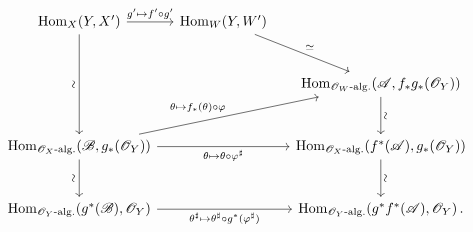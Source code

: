 \[
\begin{tikzcd}[column sep=small,row sep=large]
  \operatorname{Hom}_X(Y,X')
    \arrow[r,"g'\mapsto f'\circ g'"]
    \arrow[dd,"\rotatebox{90}{$\sim$}"']
  &
  \operatorname{Hom}_W(Y,W')
    \arrow[dr,"\simeq"]
  &
  {}
  \\
  {}
  &
  {}
  &
  \operatorname{Hom}_{\mathscr O_W\text{-}\mathrm{alg.}}
    \!\left(\mathscr A,f_*g_*(\mathscr O_Y)\right)
    \arrow[d,"\rotatebox{90}{$\sim$}"]
  \\
  \operatorname{Hom}_{\mathscr O_X\text{-}\mathrm{alg.}}
    \!\left(\mathscr B,g_*(\mathscr O_Y)\right)
    \arrow[urr,"\theta\mapsto f_*(\theta)\circ\varphi"]
    \arrow[rr,"\theta\mapsto\theta\circ\varphi^\sharp"']
    \arrow[d,"\rotatebox{90}{$\sim$}"']
  &
  {}
  &
  \operatorname{Hom}_{\mathscr O_X\text{-}\mathrm{alg.}}
    \!\left(f^*(\mathscr A),g_*(\mathscr O_Y)\right)
    \arrow[d,"\rotatebox{90}{$\sim$}"]
  \\
  \operatorname{Hom}_{\mathscr O_Y\text{-}\mathrm{alg.}}
    \!\left(g^*(\mathscr B),\mathscr O_Y\right)
    \arrow[rr,
      "\theta^\sharp\mapsto
       \theta^\sharp\circ g^*(\varphi^\sharp)"']
  &
  {}
  &
  \operatorname{Hom}_{\mathscr O_Y\text{-}\mathrm{alg.}}
    \!\left(g^*f^*(\mathscr A),\mathscr O_Y\right).
\end{tikzcd}
\]
